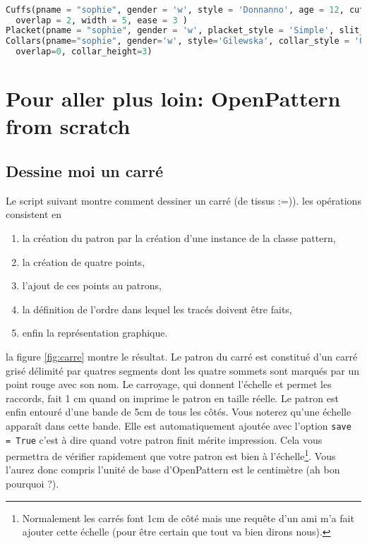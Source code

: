 \documentclass[10pt,a4paper,twoside]{report}
\begin{document}
\begin{lstlisting}[language=python]

Cuffs(pname = "sophie", gender = 'w', style = 'Donnanno', age = 12, cuff_style = 'Simple',\
  overlap = 2, width = 5, ease = 3 )
Placket(pname = "sophie", gender = 'w', placket_style = 'Simple', slit_length = 10)
Collars(pname="sophie", gender='w', style='Gilewska', collar_style = 'Officer',\
  overlap=0, collar_height=3)

\end{lstlisting}

\chapter{Pour aller plus loin: OpenPattern from scratch}

\section{Dessine moi un carré}

Le script suivant montre comment dessiner un carré (de tissus :=)).
les opérations consistent en
\begin{enumerate}
  \item la création du patron par la création d'une instance de la classe pattern,
  \item la création de quatre points,
  \item l'ajout de ces points au patrons,
  \item la définition de l'ordre dans lequel les tracés doivent être faits,
  \item enfin la représentation graphique.
\end{enumerate}



la figure \ref{fig:carre} montre le résultat. Le patron du carré est constitué d'un carré grisé délimité par quatres segments dont les quatre sommets sont marqués par un point rouge avec son nom.  Le carroyage, qui donnent l'échelle et permet les raccords, fait 1 cm quand on imprime le patron en taille réelle. Le patron est enfin entouré d'une bande de 5cm de tous les côtés. Vous noterez qu'une échelle apparaît dans cette bande. Elle est automatiquement ajoutée avec l'option \texttt{save = True} c'est à dire quand votre patron finit mérite impression. Cela vous permettra de vérifier rapidement que votre patron est bien à l'échelle\footnote{Normalement les carrés font 1cm de côté mais une requête d'un ami m'a fait ajouter cette échelle (pour être certain que tout va bien dirons nous).}. Vous l'aurez donc compris l'unité de base d'OpenPattern est le centimètre (ah bon pourquoi ?).
\end{document}
